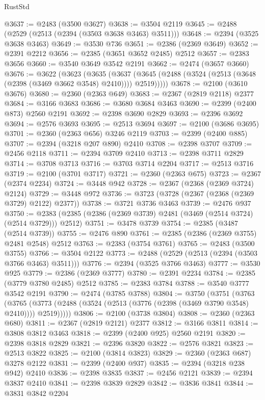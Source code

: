 \begin{lexlean}{RustStd}
\begin{coremodule}
{\begin{coremodule}
{{{{{{{{{{{{{{{{{{{{{{{{{{{{{{{{{{{{{{{{{{{{{{{{{{@3637 := @2483 (@3500 @3627)
@3638 := @3504 @2119
@3645 := @2488 (@2529 (@2513 (@2394 (@3503 @3638 @3463) @3511)))
@3648 := @2394 (@3525 @3638 @3463)
@3649 := @3530 @736
@3651 := @2386 (@2369 @3649)
@3652 := @2391 @2212
@3656 := @2385 (@3651 @3652 @2485) @2512
@3657 := @2383 @3656
@3660 := @3540 @3649 @3542 @2191
@3662 := @2474 (@3657 @3660)
@3676 := @3622
    (@3623
      (@3635
        (@3637 (@3645 (@2488 (@3524 (@2513 (@3648 (@2398 (@3469 @3662 @3548) @2410)))) @2519)))))
@3678 := @2100 (@3610 @3676)
@3680 := @2360 (@2363 @649)
@3683 := @2367 (@2819 @2118) @2377
@3684 := @3166 @3683
@3686 := @3680 @3684 @3463
@3690 := @2399 (@2400 @873) @2560 @2191
@3692 := @2398 @3690 @2829
@3693 := @2396 @3692
@3694 := @2576 @3693
@3695 := @2513 @3694
@3697 := @2100 (@3686 @3695)
@3701 := @2360 (@2363 @656) @3246 @2119
@3703 := @2399 (@2400 @885)
@3707 := @2394 (@3218 @207 @890) @2410
@3708 := @2398 @3707
@3709 := @2456 @2118
@3711 := @2394 @3709 @2410
@3713 := @2398 @3711 @2829
@3714 := @3708 @3713
@3716 := @3703 @3714 @2204
@3717 := @2513 @3716
@3719 := @2100 (@3701 @3717)
@3721 := @2360 (@2363 @675)
@3723 := @2367 (@2374 @2234)
@3724 := @3448 @942
@3728 := @2367 (@2368 (@2369 @3724) @2124)
@3729 := @3448 @972
@3736 := @3723 (@3728 (@2367 (@2368 (@2369 @3729) @2122) @2377))
@3738 := @3721 @3736 @3463
@3739 := @2476 @937
@3750 := @2383 (@2385 (@2386 (@2369 @3739) @2481 (@3469 (@2514 @3724) (@2514 @3729))) @2512)
@3751 := @3478 @3739
@3754 := @2385 (@3487 (@2514 @3739))
@3755 := @2476 @890
@3761 := @2385 (@2386 (@2369 @3755) @2481 @2548) @2512
@3763 := @2383 (@3754 @3761)
@3765 := @2483 (@3500 @3755)
@3766 := @3504 @2122
@3773 := @2488 (@2529 (@2513 (@2394 (@3503 @3766 @3463) @3511)))
@3776 := @2394 (@3525 @3766 @3463)
@3777 := @3530 @925
@3779 := @2386 (@2369 @3777)
@3780 := @2391 @2234
@3784 := @2385 (@3779 @3780 @2485) @2512
@3785 := @2383 @3784
@3788 := @3540 @3777 @3542 @2191
@3790 := @2474 (@3785 @3788)
@3804 := @3750
    (@3751
      (@3763
        (@3765 (@3773 (@2488 (@3524 (@2513 (@3776 (@2398 (@3469 @3790 @3548) @2410)))) @2519)))))
@3806 := @2100 (@3738 @3804)
@3808 := @2360 (@2363 @680)
@3811 := @2367 (@2819 @2121) @2377
@3812 := @3166 @3811
@3814 := @3808 @3812 @3463
@3818 := @2399 (@2400 @925) @2560 @2191
@3820 := @2398 @3818 @2829
@3821 := @2396 @3820
@3822 := @2576 @3821
@3823 := @2513 @3822
@3825 := @2100 (@3814 @3823)
@3829 := @2360 (@2363 @687) @3278 @2122
@3831 := @2399 (@2400 @937)
@3835 := @2394 (@3218 @238 @942) @2410
@3836 := @2398 @3835
@3837 := @2456 @2121
@3839 := @2394 @3837 @2410
@3841 := @2398 @3839 @2829
@3842 := @3836 @3841
@3844 := @3831 @3842 @2204
}}}}}}}}}}}}}}}}}}}}}}}}}}}}}}}}}}}}}}}}}}}}}}}}}}
\end{coremodule}}
\end{coremodule}
\end{lexlean}
